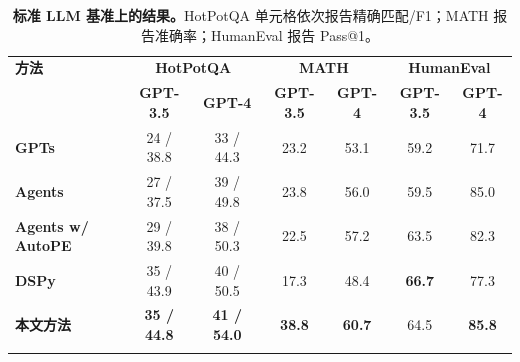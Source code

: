 \begin{table}[htb]
  \centering
  \caption{\textbf{标准 LLM 基准上的结果。}HotPotQA 单元格依次报告精确匹配/F1；MATH 报告准确率；HumanEval 报告 Pass@1。}
  \label{tab:benchmark_results}
  \small
  \renewcommand\tabcolsep{6pt}
  \renewcommand\arraystretch{1.16}
  \begin{tabular}{l|cc|cc|cc}
  \Xhline{1.5pt}
  \textbf{方法} & \multicolumn{2}{c|}{\textbf{HotPotQA}} & \multicolumn{2}{c|}{\textbf{MATH}} & \multicolumn{2}{c}{\textbf{HumanEval}} \\
                   & \textbf{GPT-3.5} & \textbf{GPT-4} & \textbf{GPT-3.5} & \textbf{GPT-4} & \textbf{GPT-3.5} & \textbf{GPT-4} \\
  \Xhline{1.5pt}
  \bfseries GPTs & 24 / 38.8 & 33 / 44.3 & 23.2 & 53.1 & 59.2 & 71.7 \\
  \bfseries Agents & 27 / 37.5 & 39 / 49.8 & 23.8 & 56.0 & 59.5 & 85.0 \\
  \bfseries Agents w/ AutoPE & 29 / 39.8 & 38 / 50.3 & 22.5 & 57.2 & 63.5 & 82.3 \\
  \bfseries DSPy & 35 / 43.9 & 40 / 50.5 & 17.3 & 48.4 & \bfseries 66.7 & 77.3 \\ \hline
  \bfseries 本文方法 & \bfseries 35 / 44.8 & \bfseries 41 / 54.0 & \bfseries 38.8 & \bfseries 60.7 & 64.5 & \bfseries 85.8 \\
  \Xhline{1.5pt}
  \end{tabular}
\end{table}
